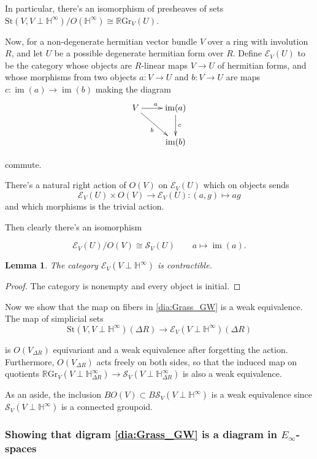 \documentclass[draftthesis,tocnosub,noragright,centerchapter,10pt]{uiucthesis2009}
\newcommand{\mbb}{\mathbb}
\newcommand{\mc}{\mathcal}
\newcommand{\RGr}{\mathbb R\mathrm{Gr}}
\newcommand{\St}{\mathrm{St}}
\DeclareMathOperator*{\im}{im}
\theoremstyle{plain}
\newtheorem{lemma}{Lemma}
\theoremstyle{definition}
\begin{document}
In particular, there's an isomorphism of presheaves of sets $\St(V,V \perp \mbb
H^\infty)/O(\mbb H^\infty) \cong \RGr_V(U)$.

Now, for a non-degenerate hermitian vector bundle $V$ over a ring with
involution $R$, and let $U$ be a possible degenerate hermitian form
over $R$. Define $\mc E_V(U)$ to be the category whose objects are
$R$-linear maps $V \rightarrow U$ of hermitian forms, and whose
morphisms from two objects $a : V \rightarrow U$ and $b : V
\rightarrow U$ are maps $c : \im(a) \rightarrow \im(b)$ making the
diagram
\[
\xymatrix{V \ar[r]^a\ar[dr]_b & \im(a) \ar[d]^c\\ & \im(b)}
\]

commute.

There's a natural right action of $O(V)$ on $\mc E_V(U)$ which on
objects sends
\[
\mc E_V(U) \times O(V) \rightarrow \mc E_V(U) : (a,g) \mapsto ag
\]
and which morphisms is the trivial action.

Then clearly there's an isomorphism

\[
\mc E_V(U)/O(V) \cong \mc S_V(U) \qquad a \mapsto \im(a).
\] 

\begin{lemma}
The category $\mc E_V(V \perp \mbb H^\infty)$ is contractible.
\end{lemma}

\begin{proof}
The category is nonempty and every object is initial.
\end{proof}

Now we show that the map on fibers in \ref{dia:Grass_GW} is a weak
equivalence. The map of simplicial sets
\[
\St(V,V\perp \mbb H^\infty)(\Delta R) \rightarrow \mc E_V(V \perp \mbb
H^\infty)(\Delta R)
\]

is $O(V_{\Delta R})$ equivariant and a weak equivalence after
forgetting the action. Furthermore, $O(V_{\Delta R})$ acts freely on
both sides, so that the induced map on quotients $\RGr_V(V \perp \mbb
H^\infty_{\Delta R}) \rightarrow \mc S_V(V \perp \mbb H^\infty_{\Delta
  R})$ is also a weak equivalence. 

As an aside, the inclusion $BO(V) \subset B\mc S_V(V \perp \mbb
H^\infty)$ is a weak equivalence since $\mc S_V(V \perp \mbb
H^\infty)$ is a connected groupoid. 

\subsubsection{Showing that digram \ref{dia:Grass_GW} is a diagram in
  $E_\infty$-spaces}
\end{document}
